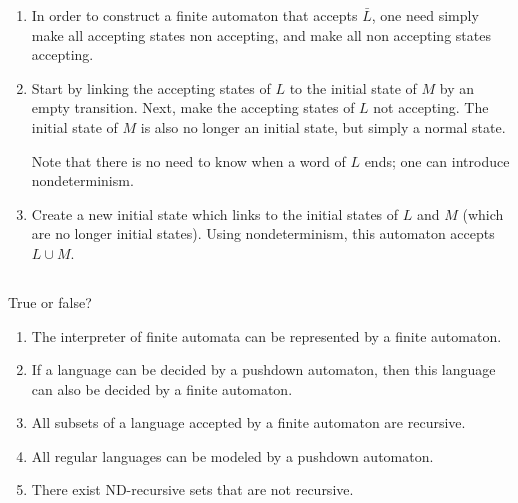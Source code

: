 \begin{solution}
\begin{enumerate}
	\item In order to construct a finite automaton that accepts \(\bar{L}\),
	one need simply make all accepting states non accepting,
	and make all non accepting states accepting.
	\item Start by linking the accepting states of \(L\)
	to the initial state of \(M\) by an empty transition.
	Next, make the accepting states of \(L\) not accepting.
	The initial state of \(M\) is also no longer an initial state,
	but simply a normal state.

	Note that there is no need to know when a word of \(L\) ends;
	one can introduce nondeterminism.
	\item Create a new initial state which links
	to the initial states of \(L\) and \(M\)
	(which are no longer initial states).
	Using nondeterminism, this automaton accepts \(L \cup M\).
\end{enumerate}
\end{solution}

\subsection{} %
True or false?
\begin{enumerate}
	\item The interpreter of finite automata
	can be represented by a finite automaton.
	\item If a language can be decided by a pushdown automaton,
	then this language can also be decided by a finite automaton.
	\item All subsets of a language accepted by
	a finite automaton are recursive.
	\item All regular languages can be modeled by a pushdown automaton.
	\item There exist ND-recursive sets that are not recursive.
\end{enumerate}

